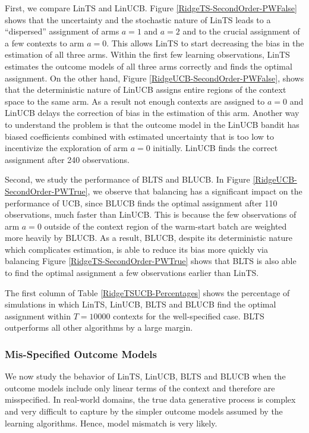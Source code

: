 \documentclass[letterpaper]{article} %
\begin{document}
First, we compare LinTS and LinUCB.
Figure \ref{RidgeTS-SecondOrder-PWFalse} shows that
the uncertainty and the stochastic nature of LinTS leads to a ``dispersed'' assignment of arms $a=1$ and $a=2$ and to the crucial assignment of a few contexts to arm $a = 0$.
This allows LinTS to start decreasing the bias in the estimation of all three arms.
Within the first few learning observations, LinTS estimates the outcome models of all three arms correctly and finds the optimal assignment.
On the other hand, Figure \ref{RidgeUCB-SecondOrder-PWFalse}, shows that the deterministic nature of LinUCB assigns entire regions of the context space to the same arm.
As a result not enough contexts are assigned to $a=0$ and LinUCB delays the correction of bias in the estimation of this arm.
Another way to understand the problem is that the outcome model in the LinUCB bandit has biased coefficients combined with estimated uncertainty that is too low to incentivize the exploration of arm $a = 0$ initially.
LinUCB finds the correct assignment after 240 observations.

Second, we study the performance of  BLTS and BLUCB.
In Figure \ref{RidgeUCB-SecondOrder-PWTrue}, we observe that balancing has a significant impact on the performance of UCB, since BLUCB finds the optimal assignment after 110 observations, much faster than LinUCB.
This is because the few observations of arm $a = 0$ outside of the context region of the warm-start batch are weighted more heavily by BLUCB.
As a result, BLUCB, despite its deterministic nature which complicates estimation, is able to reduce its bias more quickly via balancing
Figure \ref{RidgeTS-SecondOrder-PWTrue} shows that BLTS is also able to find the optimal assignment a few observations earlier than LinTS.

The first column of Table \ref{RidgeTSUCB-Percentages} shows the percentage of simulations in which LinTS, LinUCB, BLTS and BLUCB find the optimal assignment within $T = 10000$ contexts for the well-specified case.
BLTS outperforms all other algorithms by a large margin.


\subsubsection{Mis-Specified Outcome Models}

We now study the behavior of LinTS, LinUCB, BLTS and BLUCB when the outcome models include only linear terms of the context and therefore are misspecified.
In real-world domains, the true data generative process is complex and very difficult to capture by the simpler outcome models assumed by the learning algorithms.
Hence, model mismatch is very likely.
\end{document}
